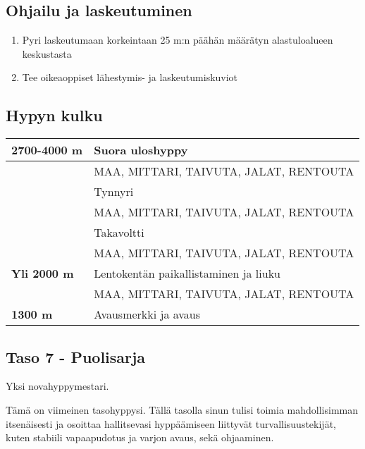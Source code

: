 \begin{multicols}{2}
\subsection{ Ohjailu ja laskeutuminen }
\label{nova-alkeiskoulutuksen-suoritukset-ohjailu-ja-laskeutuminen}

\begin{enumerate}[label=\bfseries \arabic*)]
\item  Pyri laskeutumaan korkeintaan 25 m:n päähän määrätyn alastuloalueen keskustasta 
\item  Tee oikeaoppiset lähestymis- ja laskeutumiskuviot 
\end{enumerate}
\subsection{ Hypyn kulku }
\label{nova-alkeiskoulutuksen-suoritukset-hypyn-kulku}

\begin{tabular}[]{|l|p{4.7cm}|}
\hline
 \textbf{2700-4000 m} &  Suora uloshyppy 
\\ \hline
  &  MAA, MITTARI, TAIVUTA, JALAT, RENTOUTA
\\ \hline
  &  Tynnyri
\\ \hline
  &  MAA, MITTARI, TAIVUTA, JALAT, RENTOUTA
\\ \hline
  &  Takavoltti
\\ \hline
  &  MAA, MITTARI, TAIVUTA, JALAT, RENTOUTA
\\ \hline
 \textbf{Yli 2000 m} &  Lentokentän paikallistaminen ja liuku
\\ \hline
  &  MAA, MITTARI, TAIVUTA, JALAT, RENTOUTA
\\ \hline
 \textbf{1300 m} &  Avausmerkki ja avaus
\\ \hline
\end{tabular}

\end{multicols}\pagebreak\begin{multicols}{2} 

\section{ Taso 7 - Puolisarja }
\label{nova-alkeiskoulutuksen-suoritukset-taso-7-puolisarja}


Yksi novahyppymestari. 


Tämä on viimeinen tasohyppysi. Tällä tasolla sinun tulisi toimia mahdollisimman itsenäisesti ja osoittaa hallitsevasi hyppäämiseen liittyvät turvallisuustekijät, kuten stabiili vapaapudotus ja varjon avaus, sekä ohjaaminen. 


\end{multicols}
